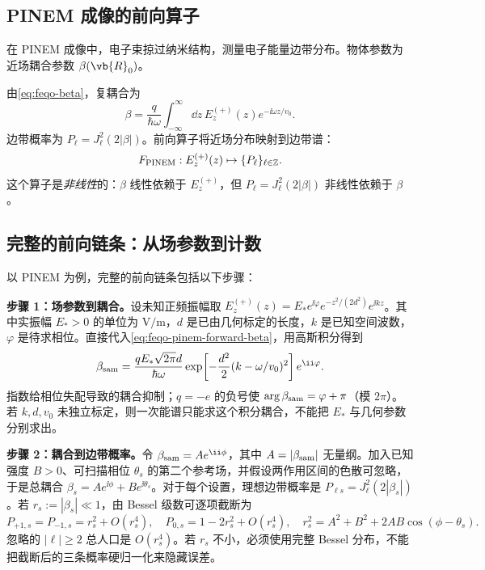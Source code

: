 \subsection{PINEM 成像的前向算子}

在 PINEM 成像中，电子束掠过纳米结构，测量电子能量边带分布。物体参数为近场耦合参数 \(\beta(\vb{R}_0)\)。

由\cref{eq:feqo-beta}，复耦合为
\begin{equation}
\beta=\frac{q}{\hbar\omega}\int_{-\infty}^{\infty}\dd z\,
E_z^{(+)}(z)e^{-\ii\omega z/v_0}.
\label{eq:feqo-pinem-forward-beta}
\end{equation}
边带概率为 \(P_\ell=J_\ell^2(2|\beta|)\)。前向算子将近场分布映射到边带谱：
\begin{equation}
F_{\rm PINEM}:E_z^{(+)}(z)
\mapsto\{P_\ell\}_{\ell\in\mathbb Z}.
\label{eq:feqo-pinem-forward-map}
\end{equation}
这个算子是\emph{非线性}的：\(\beta\) 线性依赖于 \(E_z^{(+)}\)，但 \(P_\ell=J_\ell^2(2|\beta|)\) 非线性依赖于 \(\beta\)。

\subsection{完整的前向链条：从场参数到计数}

以 PINEM 为例，完整的前向链条包括以下步骤：

\textbf{步骤 1：场参数到耦合。}设未知正频振幅取
\(E_z^{(+)}(z)=E_*e^{\ii\varphi}e^{-z^2/(2d^2)}e^{\ii kz}\)。其中实振幅 \(E_*>0\) 的单位为 \(\si{\volt\per\metre}\)，\(d\) 是已由几何标定的长度，\(k\) 是已知空间波数，\(\varphi\) 是待求相位。直接代入\cref{eq:feqo-pinem-forward-beta}，用高斯积分得到
\begin{equation}
\beta_{\rm sam}=\frac{qE_*\sqrt{2\pi}d}{\hbar\omega}
\exp\!\left[-\frac{d^2}{2}(k-\omega/v_0)^2\right]e^{\ii\varphi}.
\label{eq:feqo-imaging-beta}
\end{equation}
指数给相位失配导致的耦合抑制；\(q=-e\) 的负号使 \(\arg\beta_{\rm sam}=\varphi+\pi\)（模 \(2\pi\)）。若 \(k,d,v_0\) 未独立标定，则一次能谱只能求这个积分耦合，不能把 \(E_*\) 与几何参数分别求出。

\textbf{步骤 2：耦合到边带概率。}令 \(\beta_{\rm sam}=A e^{\ii\phi}\)，其中 \(A=|\beta_{\rm sam}|\) 无量纲。加入已知强度 \(B>0\)、可扫描相位 \(\theta_s\) 的第二个参考场，并假设两作用区间的色散可忽略，于是总耦合 \(\beta_s=Ae^{\ii\phi}+Be^{\ii\theta_s}\)。对于每个设置，理想边带概率是 \(P_{\ell s}=J_\ell^2(2|\beta_s|)\)。若 \(r_s:=|\beta_s|\ll1\)，由 Bessel 级数可逐项截断为
\begin{equation}
P_{+1,s}=P_{-1,s}=r_s^2+O(r_s^4),\quad
P_{0,s}=1-2r_s^2+O(r_s^4),\quad
r_s^2=A^2+B^2+2AB\cos(\phi-\theta_s).
\label{eq:feqo-imaging-weak-forward}
\end{equation}
忽略的 \(|\ell|\geq2\) 总人口是 \(O(r_s^4)\)。若 \(r_s\) 不小，必须使用完整 Bessel 分布，不能把截断后的三条概率硬归一化来隐藏误差。


